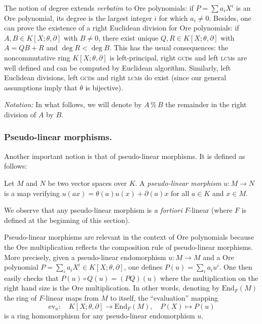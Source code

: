 \documentclass[a4paper]{llncs}
\newcommand{\End}{\textrm{End}}
\newcommand{\ev}[1]{\textrm{ev}_{#1}}
\renewcommand{\mod}{\,\%\,}
\begin{document}
The notion of degree extends \emph{verbatim} to Ore polynomials: if $P = 
\sum a_iX^i$ is an Ore polynomial, its degree is the largest integer $i$ 
for which $a_i \neq 0$.
Besides, one can prove the existence of a right Euclidean division for 
Ore polynomials: if $A, B \in K[X;\theta,\partial]$ with $B \neq 0$, 
there exist unique $Q, R \in K[X;\theta,\partial]$ with $A = QB+R$ and 
$\deg R < \deg B$. This has the usual consequences: the noncommutative
ring $K[X;\theta,\partial]$ is left-principal, right \textsc{gcd}s and
left \textsc{lcm}s are well defined and can be computed by Euclidean
algorithm. 
Similarly, left Euclidean divisions, left \textsc{gcd}s and right 
\textsc{lcm}s do exist (since our general assumptions imply that
$\theta$ is bijective).

\medskip

\noindent
\textit{Notation:}
In what follows, we will denote by $A \mod B$ the remainder in the 
right division of $A$ by $B$.

\subsubsection*{Pseudo-linear morphisms.}

Another important notion is that of pseudo-linear morphisms. It is 
defined as follows:

\begin{definition}
Let $M$ and $N$ be two vector spaces over $K$.
A \emph{pseudo-linear morphism} $u : M\to N$ is a map verifying 
$u(ax) = \theta(a)u(x) + \partial(a)x$ for all $a \in K$ and $x \in M$.
\end{definition}

We observe that any pseudo-linear morphism is \emph{a fortiori}
$F$-linear (where $F$ is defined at the beginning of this section).

Pseudo-linear morphisms are relevant in the context of Ore polynomials 
because the Ore multiplication reflects the composition rule of 
pseudo-linear morphisms. More precisely, given a pseudo-linear 
endomorphism $u : M \to M$ and a Ore polynomial $P = \sum_i a_i X^i \in 
K[X;\theta,\partial]$, one defines $P(u) = \sum_i a_i u^i$. One then 
easily checks that $P(u) \circ Q(u) = (PQ)(u)$ where the multiplication 
on the right hand size is the Ore multiplication. In other words, 
denoting by $\End_F(M)$ the ring of $F$-linear maps from $M$ to itself, 
the ``evaluation'' mapping
$$\ev{u} : \quad K[X;\theta,\partial] \to \End_F(M), \quad
P(X) \mapsto P(u)$$
is a ring homomorphism for any pseudo-linear endomorphism $u$.
\end{document}
